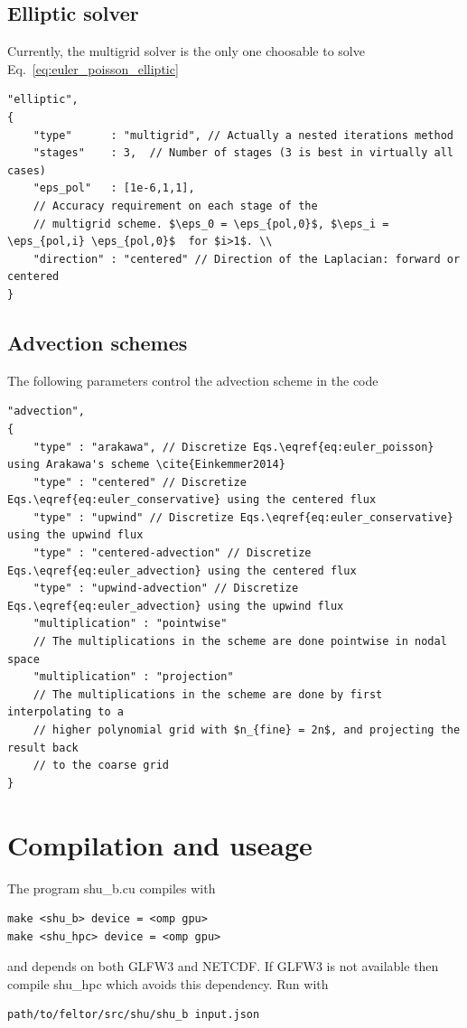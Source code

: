 \subsection{Elliptic solver}
Currently, the multigrid solver is the only one choosable
to solve Eq.~\eqref{eq:euler_poisson_elliptic}
\begin{verbatim}
"elliptic",
{
    "type"      : "multigrid", // Actually a nested iterations method
    "stages"    : 3,  // Number of stages (3 is best in virtually all cases)
    "eps_pol"   : [1e-6,1,1],
    // Accuracy requirement on each stage of the
    // multigrid scheme. $\eps_0 = \eps_{pol,0}$, $\eps_i = \eps_{pol,i} \eps_{pol,0}$  for $i>1$. \\
    "direction" : "centered" // Direction of the Laplacian: forward or centered
}
\end{verbatim}
\subsection{Advection schemes}
The following parameters control the advection scheme in the code
\begin{verbatim}
"advection",
{
    "type" : "arakawa", // Discretize Eqs.\eqref{eq:euler_poisson} using Arakawa's scheme \cite{Einkemmer2014}
    "type" : "centered" // Discretize Eqs.\eqref{eq:euler_conservative} using the centered flux
    "type" : "upwind" // Discretize Eqs.\eqref{eq:euler_conservative} using the upwind flux
    "type" : "centered-advection" // Discretize Eqs.\eqref{eq:euler_advection} using the centered flux
    "type" : "upwind-advection" // Discretize Eqs.\eqref{eq:euler_advection} using the upwind flux
    "multiplication" : "pointwise"
    // The multiplications in the scheme are done pointwise in nodal space
    "multiplication" : "projection"
    // The multiplications in the scheme are done by first interpolating to a
    // higher polynomial grid with $n_{fine} = 2n$, and projecting the result back
    // to the coarse grid
}
\end{verbatim}

\section{Compilation and useage}
The program shu\_b.cu compiles with
\begin{verbatim}
make <shu_b> device = <omp gpu>
make <shu_hpc> device = <omp gpu>
\end{verbatim}
and depends on both GLFW3 and NETCDF. If GLFW3 is not available then compile shu\_hpc which avoids this dependency.
Run with
\begin{verbatim}
path/to/feltor/src/shu/shu_b input.json
\end{verbatim}

